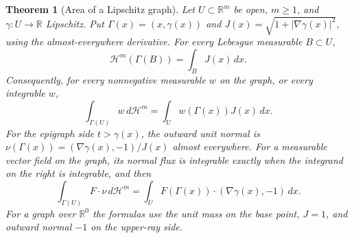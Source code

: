 \documentclass[11pt,oneside,openany]{book}
\newtheorem{theorem}{Theorem}[chapter]
\theoremstyle{definition}
\theoremstyle{remark}
\begin{document}
\begin{theorem}[Area of a Lipschitz graph]
\label{p102:u4-lipschitz-graph-area}
Let \(U\subset\mathbb R^m\) be open, \(m\geq1\), and
\(\gamma:U\to\mathbb R\) Lipschitz. Put
\(\Gamma(x)=(x,\gamma(x))\) and \(J(x)=\sqrt{1+|\nabla\gamma(x)|^2}\),
using the almost-everywhere derivative. For every Lebesgue
measurable \(B\subset U\),
\[
 \mathcal H^m(\Gamma(B))=\int_B J(x)\,dx .
\]
Consequently, for every nonnegative measurable \(w\) on the graph,
or every integrable \(w\),
\[
 \int_{\Gamma(U)} w\,d\mathcal H^m
   =\int_U w(\Gamma(x))J(x)\,dx .
\]
For the epigraph side \(t>\gamma(x)\), the outward unit normal
is \(\nu(\Gamma(x))=(\nabla\gamma(x),-1)/J(x)\) almost everywhere.
For a measurable vector field on the graph, its normal flux
is integrable exactly when the integrand on the right is
integrable, and then
\[
 \int_{\Gamma(U)} F\cdot\nu\,d\mathcal H^m
   =\int_U F(\Gamma(x))\cdot(\nabla\gamma(x),-1)\,dx .
\]
For a graph over \(\mathbb R^0\) the formulas use the unit mass
on the base point, \(J=1\), and outward normal \(-1\) on the
upper-ray side.
\end{theorem}
\end{document}
